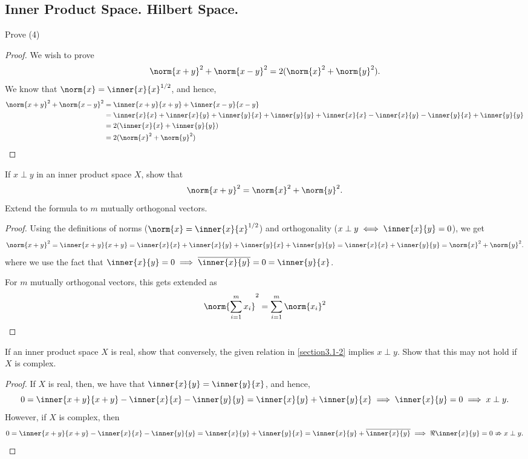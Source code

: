 \subsection{Inner Product Space.
Hilbert Space.}


\begin{question}
    Prove (4)
    \label{section3.1-1}
\end{question}
\begin{proof}
    We wish to prove
    \[\norm{x+y}^2 + \norm{x-y}^2 = 2(\norm{x}^2 + \norm{y}^2).\]
    We know that $\norm{x} = \inner{x}{x}^{1/2}$, and hence, 
    \begin{align*}
        \norm{x+y}^2 + \norm{x-y}^2 &= \inner{x+y}{x+y} + \inner{x-y}{x-y}
        \\
        &= \inner{x}{x} + \inner{x}{y} + \inner{y}{x} + \inner{y}{y} + \inner{x}{x} - \inner{x}{y} - \inner{y}{x} + \inner{y}{y}
        \\
        &= 2(\inner{x}{x} + \inner{y}{y})
        \\
        &=2(\norm{x}^2 + \norm{y}^2)
    \end{align*}
\end{proof}

\begin{question}
    If $x \perp y$ in an inner product space $X$, show that 
    \[\norm{x+y}^2 = \norm{x}^2 + \norm{y}^2.\]
    Extend the formula to $m$ mutually orthogonal vectors. 
    \label{section3.1-2}
\end{question}
\begin{proof}
    Using the definitions of norms ($\norm{x} = \inner{x}{x}^{1/2}$) and orthogonality ($x \perp y \iff \inner{x}{y} = 0$), we get
    \[\norm{x + y}^2 = \inner{x+y}{x+y} = \inner{x}{x} + \inner{x}{y} + \inner{y}{x} + \inner{y}{y} = \inner{x}{x} + \inner{y}{y} = \norm{x}^2 + \norm{y}^2.\]
    where we use the fact that $\inner{x}{y} = 0  \implies \overline{\inner{x}{y}} = 0 = \inner{y}{x}$. 

    For $m$ mutually orthogonal vectors, this gets extended as
    \[\norm{\sum_{i=1}^m x_i}^2 = \sum_{i=1}^m \norm{x_i}^2\]
\end{proof}

\begin{question}
    If an inner product space $X$ is real, show that conversely, the given relation in \ref{section3.1-2} implies $x \perp y$. Show that this may not hold if $X$ is complex.
    \label{section3.1-3}
\end{question}
\begin{proof}
    If $X$ is real, then, we have that $\inner{x}{y} = \inner{y}{x}$, and hence, 
    \[0 = \inner{x+y}{x+y} - \inner{x}{x} - \inner{y}{y} = \inner{x}{y} + \inner{y}{x} \implies \inner{x}{y} = 0 \implies x \perp y.\]
    However, if $X$ is complex, then
    \[0 = \inner{x+y}{x+y} - \inner{x}{x} - \inner{y}{y} = \inner{x}{y} + \inner{y}{x} = \inner{x}{y} + \overline{\inner{x}{y}} \implies \Re\inner{x}{y} = 0 \nRightarrow x \perp y.\]
\end{proof}

